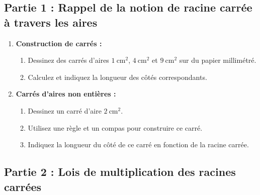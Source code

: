 \documentclass{article}
\title{\Document\ \Titre \Type}
\author{}
\date{}
\begin{document}
\pagestyle{fancy}
\fancyhead{} %
\fancyhead[R]{\Structure}
\fancyhead[L]{\Niveau}
\fancyfoot{} %
\fancyfoot[C]{\thepage}


\setlength{\headsep}{0pt}

\maketitle
\vspace{-4em}

\subsection*{Partie 1 : Rappel de la notion de racine carrée à travers les aires}

\begin{enumerate}
    \item \textbf{Construction de carrés :}
    \begin{enumerate}
        \item Dessinez des carrés d'aires $1~\text{cm}^2$, $4~\text{cm}^2$ et $9~\text{cm}^2$ sur du papier millimétré.
        \item Calculez et indiquez la longueur des côtés correspondants.
    \end{enumerate}
    \item \textbf{Carrés d'aires non entières :}
    \begin{enumerate}
        \item Dessinez un carré d'aire $2~\text{cm}^2$.
        \item Utilisez une règle et un compas pour construire ce carré.
        \item Indiquez la longueur du côté de ce carré en fonction de la racine carrée.
    \end{enumerate}
\end{enumerate}

\subsection*{Partie 2 : Lois de multiplication des racines carrées}
\end{document}
